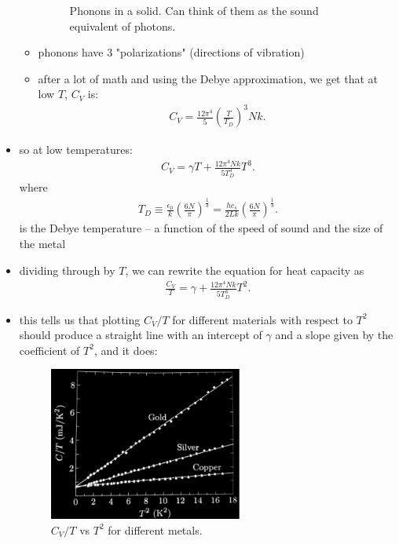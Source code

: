 \documentclass[10pt]{article}
\begin{document}
\begin{itemize}
\begin{itemize}
\begin{figure}[H]
                    \caption{Phonons in a solid. Can think of them as the sound equivalent of photons.}
                    \label{fig:phonons}
                \end{figure}
            \item phonons have 3 "polarizations" (directions of vibration)
            \item after a lot of math and using the Debye approximation, we get that at low $T$, $C_V$ is: 
                \begin{gather*}
                    C_V = \frac{12\pi^4}{5} \left( \frac{T}{T_D} \right)^3 Nk
                .\end{gather*}
        \end{itemize}
    \item so at low temperatures: 
        \begin{gather*}
            C_V = \gamma T + \frac{12\pi^4 Nk}{5T_D^3}T^3
        .\end{gather*}
        where
        \begin{gather*}
            T_D \equiv \frac{\epsilon_0}{k} \left( \frac{6N}{\pi} \right)^{\frac{1}{3}} = \frac{hc_s}{2Lk} \left( \frac{6N}{\pi} \right)^{\frac{1}{3}}
        .\end{gather*}
        is the Debye temperature -- a function of the speed of sound and the size of the metal
    \item dividing through by $T$, we can rewrite the equation for heat capacity as
        \begin{gather*}
            \frac{C_V}{T} = \gamma + \frac{12\pi^4 Nk}{5T_D^3}T^2
        .\end{gather*}
    \item this tells us that plotting $C_V / T$ for different materials with respect to $T^2$ should produce a straight line with an intercept of $\gamma$ and a slope given by the coefficient of $T^2$, and it does:
        \begin{figure}[H]
            \centering
            \includegraphics[width=0.6\textwidth]{CVSolid}
            \caption{$C_V / T$ vs $T^2$ for different metals.}
            \label{fig:CVSolid}
        \end{figure}
\end{itemize}
\end{document}
